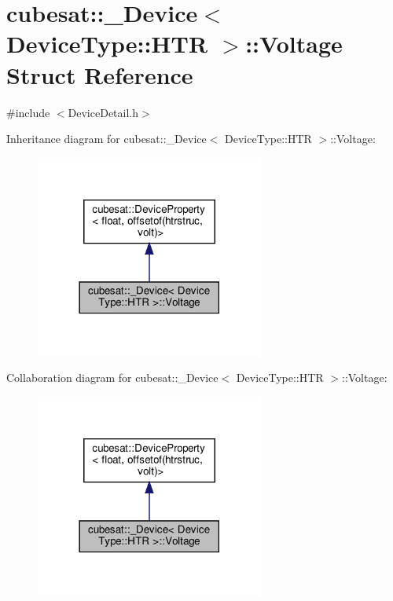 \hypertarget{structcubesat_1_1__Device_3_01DeviceType_1_1HTR_01_4_1_1Voltage}{}\section{cubesat\+:\+:\+\_\+\+Device$<$ Device\+Type\+:\+:H\+TR $>$\+:\+:Voltage Struct Reference}
\label{structcubesat_1_1__Device_3_01DeviceType_1_1HTR_01_4_1_1Voltage}


{\ttfamily \#include $<$Device\+Detail.\+h$>$}



Inheritance diagram for cubesat\+:\+:\+\_\+\+Device$<$ Device\+Type\+:\+:H\+TR $>$\+:\+:Voltage\+:\nopagebreak
\begin{figure}[H]
\begin{center}
\leavevmode
\includegraphics[width=213pt]{structcubesat_1_1__Device_3_01DeviceType_1_1HTR_01_4_1_1Voltage__inherit__graph}
\end{center}
\end{figure}


Collaboration diagram for cubesat\+:\+:\+\_\+\+Device$<$ Device\+Type\+:\+:H\+TR $>$\+:\+:Voltage\+:\nopagebreak
\begin{figure}[H]
\begin{center}
\leavevmode
\includegraphics[width=213pt]{structcubesat_1_1__Device_3_01DeviceType_1_1HTR_01_4_1_1Voltage__coll__graph}
\end{center}
\end{figure}
